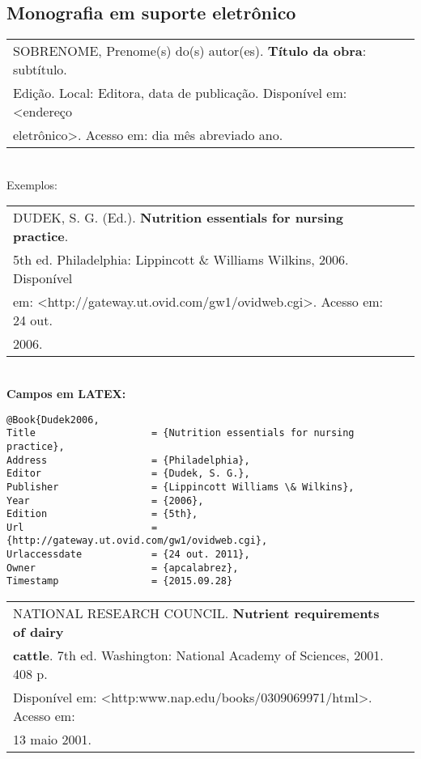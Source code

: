 \subsection{Monografia em suporte eletrônico}	 
	 
\begin{tabular}{|l|c|} \hline
SOBRENOME, Prenome(s) do(s) autor(es). \textbf{Título da obra}:
subtítulo.\\ Edição. Local: Editora, data de publicação. Disponível em: <endereço \\eletrônico>. Acesso em: dia mês abreviado ano.     \\\hline
\end{tabular} \\
	 
	Exemplos: \\ 
	 
\begin{tabular}{|l|c|} \hline
DUDEK, S. G. (Ed.). \textbf{Nutrition essentials for nursing practice}. \\5th ed. Philadelphia: Lippincott \& Williams  Wilkins, 2006. Disponível \\ em: <http://gateway.ut.ovid.com/gw1/ovidweb.cgi>. Acesso em: 24 out. \\2006.  \\\hline
\end{tabular} \\ 
	 
	 \textbf{Campos em LATEX:} 
	 
\begin{verbatim}
@Book{Dudek2006,
Title                    = {Nutrition essentials for nursing practice},
Address                  = {Philadelphia},
Editor                   = {Dudek, S. G.},
Publisher                = {Lippincott Williams \& Wilkins},
Year                     = {2006},
Edition                  = {5th},
Url                      = {http://gateway.ut.ovid.com/gw1/ovidweb.cgi},
Urlaccessdate            = {24 out. 2011},
Owner                    = {apcalabrez},
Timestamp                = {2015.09.28}

	 \end{verbatim}
	 
	 
	 \begin{tabular}{|l|c|} \hline
	 	NATIONAL RESEARCH COUNCIL. \textbf{Nutrient requirements of dairy }\\ \textbf{cattle}. 7th ed. Washington: National Academy of Sciences, 2001. 408 p.\\	Disponível em: <http:www.nap.edu/books/0309069971/html>. Acesso
	 	em: \\13 maio 2001.   \\\hline
	 \end{tabular} \\ 
	 
